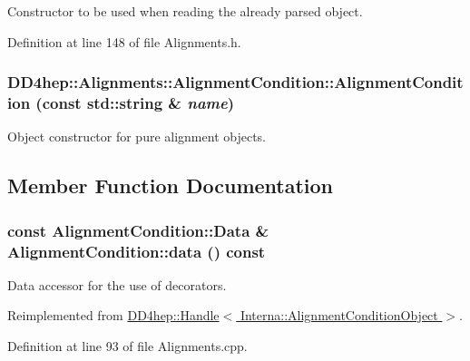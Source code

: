 Constructor to be used when reading the already parsed object. 

Definition at line 148 of file Alignments.h.\hypertarget{class_d_d4hep_1_1_alignments_1_1_alignment_condition_aac47c637a8b0c6f621e6c486244b21a2}{
\subsubsection[{AlignmentCondition}]{\setlength{\rightskip}{0pt plus 5cm}DD4hep::Alignments::AlignmentCondition::AlignmentCondition (const std::string \& {\em name})}}
\label{class_d_d4hep_1_1_alignments_1_1_alignment_condition_aac47c637a8b0c6f621e6c486244b21a2}


Object constructor for pure alignment objects. 

\subsection{Member Function Documentation}
\hypertarget{class_d_d4hep_1_1_alignments_1_1_alignment_condition_a3425870f9b961eef0be9c68cb3117614}{
\subsubsection[{data}]{\setlength{\rightskip}{0pt plus 5cm}const {\bf AlignmentCondition::Data} \& AlignmentCondition::data () const}}
\label{class_d_d4hep_1_1_alignments_1_1_alignment_condition_a3425870f9b961eef0be9c68cb3117614}


Data accessor for the use of decorators. 

Reimplemented from \hyperlink{class_d_d4hep_1_1_handle_a821fe41f46aa5ce97cfb04a6a60e5cd5}{DD4hep::Handle$<$ Interna::AlignmentConditionObject $>$}.

Definition at line 93 of file Alignments.cpp.

